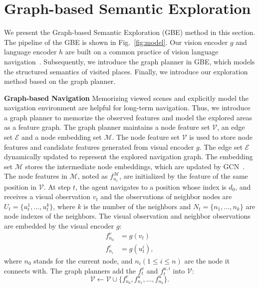 \documentclass[final]{cvpr}
\begin{document}
\section{Graph-based Semantic Exploration}
\label{sec:GBE}
We present the Graph-based Semantic Exploration (GBE) method in this section. 
The pipeline of the GBE is shown in Fig.~\ref{fig:model}. 
Our vision encoder $g$ and language encoder $h$ are built on a common practice of vision language navigation~\cite{wang2018reinforced, tan2019learning, zhu2019vision}. 
Subsequently, we introduce the graph planner in GBE, which models the structured semantics of visited places. 
Finally, we introduce our exploration method based on the graph planner. 

\noindent\textbf{Graph-based Navigation}
Memorizing viewed scenes and explicitly model the navigation environment are helpful for long-term navigation. 
Thus, we introduce a graph planner to memorize the observed features and model the explored areas as a feature graph. 
The graph planner maintains a node feature set $\mathcal{V}$, an edge set $\mathcal{E}$ and a node embedding set $\mathcal{M}$. 
The node feature set $\mathcal{V}$ is used to store node features and candidate features generated from visual encoder $g$. 
The edge set $\mathcal{E}$ dynamically updated to represent the explored navigation graph. 
The embedding set $\mathcal{M}$ stores the intermediate node embeddings, which are updated by GCN~\cite{kipf2016semi}. 
The node features in $\mathcal{M}$, noted as $f^{\mathcal{M}}_{n_i}$, are initialized by the feature of the same position in $\mathcal{V}$. 
At step $t$, the agent navigates to a position whose index is $d_0$, and receives a visual observation $v_t$ and the observations of neighbor nodes are $U_t=\{u^1_t,...,u^k_t\}$, 
where $k$ is the number of the neighbors and $N_t=\{n_1,...,n_k\}$ are node indexes of the neighbors. 
The visual observation and neighbor observations are embedded by the visual encoder $g$: 
\begin{equation}
\begin{split}
f^v_{n_0} &= g(v_t) \\
f^{c}_{n_i} &= g(u^i_t),
\end{split}
\end{equation}
where $n_0$ stands for the current node, and $n_i (1 \le i \le n)$ are the node it connects with. 
The graph planners add the $f^v_t$ and $f^{u,i}_t$ into $\mathcal{V}$: 
\begin{equation}
\mathcal{V} \leftarrow \mathcal{V} \cup  \{f^v_{n_0}, f^{u}_{n_1},...,f^{u}_{n_k}\}. 
\end{equation}
\end{document}
